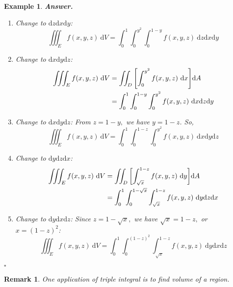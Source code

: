 \documentclass[12pt,a4paper]{article}
\newtheorem{eg}{Example}[subsection]
\newenvironment*{ans}{\par\indent\textbf{\textit{Answer. }}\par}{\par\hfill{$\square$}\par}
\newtheorem*{rmk}{\indent Remark}
\def\dsst{\displaystyle}
\def\d{{\mathrm{d}}}
\def\dx{\d x}
\def\iintD{\dsst\iint_D}
\def\iiintE{\dsst\iiint_E}
\begin{document}
\begin{eg}
\begin{ans}
		\begin{enumerate}
			\item[\ding{172}] Change to $\d z\dx\d y$: \[\iiintE f(x,y,z)\ \d V=\int_0^1\int_0^{y^2}\int_0^{1-y}f(x,y,z)\ \d z\dx\d y\] 
			\item[\ding{173}] Change to $\dx\d y\d z$: \[\begin{aligned}\iiintE f(x,y,z)\ \d V&=\iintD\qty[\int_0^{y^2}f(x,y,z)\ \dx]\d A\\&=\int_0^1\int_0^{1-y}\int_0^{y^2}f(x,y,z)\ \dx\d z\d y\end{aligned}\]
			\item[\ding{174}] Change to $\dx\d y\d z$: From $z=1-y,$ we have $y=1-z$. So, \[\iiintE f(x,y,z)\ \d V=\int_0^1\int_0^{1-z}\int_0^{y^2}f(x,y,z)\ \dx\d y\d z\]
			\item[\ding{175}] Change to $\d y\d z\dx$: \[\begin{aligned}\iiintE f(x,y,z)\ \d V&=\iintD\qty[\int_{\sqrt{x}}^{1-z}f(x,y,z)\ \d y]\d A\\&=\int_0^1\int_0^{1-\sqrt{x}}\int_{\sqrt{x}}^{1-z}f(x,y,z)\ \d y\d z\dx\end{aligned}\]
			\item[\ding{176}] Change to $\d y\dx\d z$: Since $z=1-\sqrt{x},$ we have $\sqrt{x}=1-z,$ or $x=(1-z)^2$: \[\iiintE f(x,y,z)\ \d V=\int_0^1\int_0^{(1-z)^2}\int_{\sqrt{x}}^{1-z}f(x,y,z)\ \d y\dx\d z\]
		\end{enumerate}
	\end{ans}
\end{eg}
\begin{rmk}One application of triple integral is to find volume of a region. \end{rmk}
\end{document}

